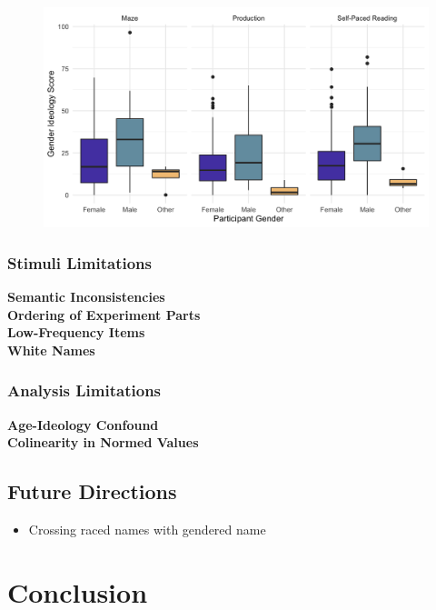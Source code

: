 \documentclass{article}
\begin{document}
	\begin{figure}[h!]
		\centering
		\includegraphics[scale=0.175]{merge_ideo_pure.png}
	\end{figure}
	
	\subsubsection{Stimuli Limitations}
	\textbf{Semantic Inconsistencies} \\
	\linebreak
	\textbf{Ordering of Experiment Parts}\\
	\linebreak
	\textbf{Low-Frequency Items}\\
	\linebreak
	\textbf{White Names}
	
	\subsubsection{Analysis Limitations}
	\textbf{Age-Ideology Confound}\\
	\linebreak
	\textbf{Colinearity in Normed Values}
	
	\subsection{Future Directions}
	
	\begin{itemize}
		\item Crossing raced names with gendered name
	\end{itemize}
	
	\newpage
	\section{Conclusion}
	
\end{document}
